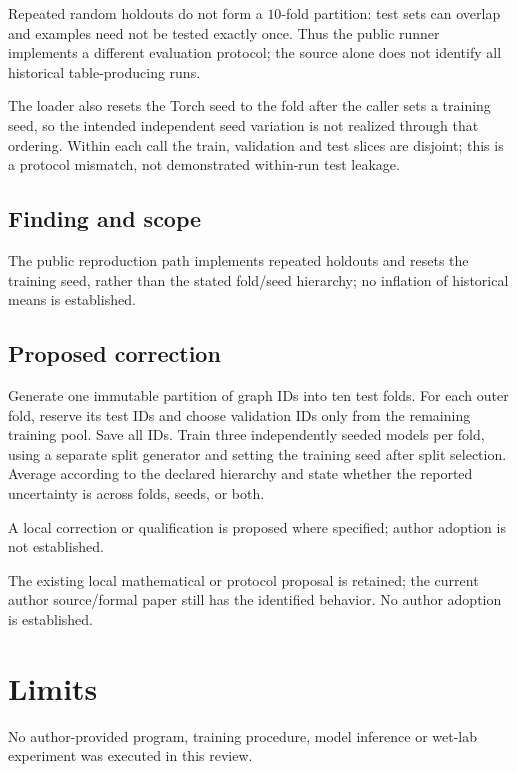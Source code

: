 \documentclass[11pt]{article}
\begin{document}
Repeated random holdouts do not form a \(10\)-fold partition: test sets can overlap and examples need not be tested exactly once. Thus the public runner implements a different evaluation protocol; the source alone does not identify all historical table-producing runs.

The loader also resets the Torch seed to the fold after the caller sets a training seed, so the intended independent seed variation is not realized through that ordering. Within each call the train, validation and test slices are disjoint; this is a protocol mismatch, not demonstrated within-run test leakage.

\subsection*{Finding and scope}

The public reproduction path implements repeated holdouts and resets the training seed, rather than the stated fold/seed hierarchy; no inflation of historical means is established.

\subsection*{Proposed correction}

Generate one immutable partition of graph IDs into ten test folds. For each outer fold, reserve its test IDs and choose validation IDs only from the remaining training pool. Save all IDs. Train three independently seeded models per fold, using a separate split generator and setting the training seed after split selection. Average according to the declared hierarchy and state whether the reported uncertainty is across folds, seeds, or both.

A local correction or qualification is proposed where specified; author adoption is not established.

The existing local mathematical or protocol proposal is retained; the current author source/formal paper still has the identified behavior. No author adoption is established.

\section*{Limits}

No author-provided program, training procedure, model inference or wet-lab experiment was executed in this review.\par
\end{document}
